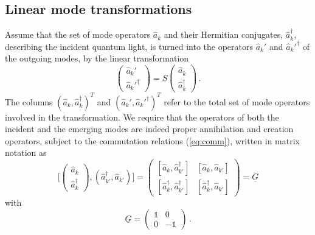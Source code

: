 \documentclass[12pt,amsmath,amssymb]{article}
\numberwithin{equation}{section}
\begin{document}
\subsection{Linear mode transformations}

Assume that the set of mode operators $\hat{a}_k$ and their Hermitian
conjugates,  $\hat{a}_k^\dagger$, describing the incident quantum light,
is turned into the operators $\hat{a}_k'$ and  $\hat{a}_k'^\dagger$
of the outgoing modes, by the linear transformation
\begin{equation}
\label{eq:linear}
\left(
    \begin{array}{c}
     \hat{a}_k'  \\
     \hat{a}_k'^\dagger
    \end{array}
\right)
=
\underline{S}
\left(
    \begin{array}{c}
     \hat{a}_k  \\
     \hat{a}_k^\dagger
    \end{array}
\right)\,.
\end{equation}
The columns $(\hat{a}_k, \hat{a}_k^\dagger)^T$ and
$(\hat{a}_k', \hat{a}_k'^\dagger)^T$
refer to the total set of mode operators involved in the transformation.
We require that the operators of both the incident and the emerging
modes are indeed proper annihilation and creation operators,
subject to the commutation relations (\ref{eq:comm}),
written in matrix notation as
\begin{equation}
\label{eq:commatrix}
\big[\left(
    \begin{array}{c}
     \hat{a}_k  \\
     \hat{a}_k^\dagger
    \end{array}
\right),
(\hat{a}_{k'}^\dagger, \hat{a}_{k'})
\big]
=
\left(
    \begin{array}{cc}
      {[\hat{a}_k,  \hat{a}_{k'}^\dagger]} &
      {[\hat{a}_k,  \hat{a}_{k'}]} \\
      {[\hat{a}_k^\dagger,  \hat{a}_{k'}^\dagger]}  &
      {[\hat{a}_k^\dagger,  \hat{a}_{k'}]}
    \end{array}
\right)
= \underline{G}
\end{equation}
with
\begin{equation}
\underline{G} =
\left(
    \begin{array}{cc}
      \mathds{1} & 0 \\
       0 & -\mathds{1}
    \end{array}
\right)
\,.
\end{equation}
\end{document}

